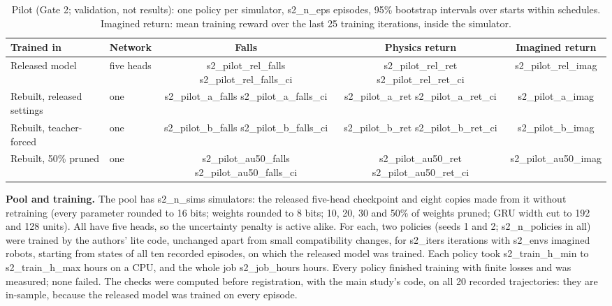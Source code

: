 \begin{table}[h]
\centering
\caption{Pilot (Gate 2; validation, not results): one policy per simulator, {{s2_n_eps}} episodes, 95\% bootstrap
intervals over starts within schedules. Imagined return: mean training reward over the last 25 training iterations,
inside the simulator.}
\label{tab:app-s2pilot}
\footnotesize
\begin{tabular}{@{}llccc@{}}
\toprule
Trained in & Network & Falls & Physics return & Imagined return \\
\midrule
Released model & five heads & {{s2_pilot_rel_falls}} {{s2_pilot_rel_falls_ci}} & {{s2_pilot_rel_ret}} {{s2_pilot_rel_ret_ci}} & {{s2_pilot_rel_imag}} \\
Rebuilt, released settings & one & {{s2_pilot_a_falls}} {{s2_pilot_a_falls_ci}} & {{s2_pilot_a_ret}} {{s2_pilot_a_ret_ci}} & {{s2_pilot_a_imag}} \\
Rebuilt, teacher-forced & one & {{s2_pilot_b_falls}} {{s2_pilot_b_falls_ci}} & {{s2_pilot_b_ret}} {{s2_pilot_b_ret_ci}} & {{s2_pilot_b_imag}} \\
Rebuilt, 50\% pruned & one & {{s2_pilot_au50_falls}} {{s2_pilot_au50_falls_ci}} & {{s2_pilot_au50_ret}} {{s2_pilot_au50_ret_ci}} & {{s2_pilot_au50_imag}} \\
\bottomrule
\end{tabular}
\end{table}

\textbf{Pool and training.} The pool has {{s2_n_sims}} simulators: the released five-head checkpoint and eight copies
made from it without retraining (every parameter rounded to 16 bits; weights rounded to 8 bits; 10, 20, 30 and 50\%
of weights pruned; GRU width cut to 192 and 128 units). All have five heads, so the uncertainty penalty is active
alike. For each, two policies (seeds 1 and 2; {{s2_n_policies}} in all) were trained by the authors' lite code,
unchanged apart from small compatibility changes, for {{s2_iters}} iterations with {{s2_envs}} imagined robots,
starting from states of all ten recorded episodes, on which the released model was trained. Each policy took
{{s2_train_h_min}} to {{s2_train_h_max}} hours on a CPU, and the whole job {{s2_job_hours}} hours. Every policy
finished training with finite losses and was measured; none failed. The checks were computed before registration, with
the main study's code, on all 20 recorded trajectories: they are in-sample, because the released model was trained
on every episode.

